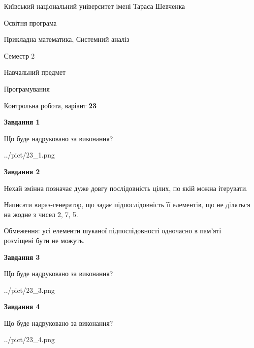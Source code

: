 \documentclass[12pt, ukrainian]{article}
\begin{document}
{{\begin {small}\par
{ \center  Київський національний університет імені Тараса Шевченка \par}
{\parbox {5 cm}{Освітня програма \hfill}{\parbox {8 cm}{Прикладна математика, Системний аналіз \hfill}}\parbox {5 cm}{\hfill Семестр 2}}\par
{\parbox {5 cm} {Навчальний предмет \hfill}\parbox {7 cm}{Програмування \hfill}\parbox {6cm}{\hfill}\par}\vspace{-7pt} \end{small}}{\center Контрольна робота, варіант  \No \textbf
{ 23 }\par}}
{
\begin {large}
{\begin {center}\textbf{Завдання 1}\end {center}}\par
Що буде надруковано за виконання?\par\par
\begin{center}
	{../pict/23_1.png}
\end{center}
\newpage

{\begin {center}\textbf{Завдання 2}\end {center}}\par
Нехай змінна  позначає дуже довгу послідовність цілих, по якій можна ітерувати.

Написати вираз-генератор, що задає підпослідовність її елементів, що не діляться на жодне з чисел 2, 7, 5.

Обмеження: усі елементи шуканої підпослідовності одночасно в пам'яті розміщені бути не можуть.\par
\newpage

{\begin {center}\textbf{Завдання 3}\end {center}}\par
Що буде надруковано за виконання?\par
\begin{center}
	{../pict/23_3.png}
\end{center}
\newpage

{\begin {center}\textbf{Завдання 4}\end {center}}\par
Що буде надруковано за виконання?\par
\begin{center}
	{../pict/23_4.png}
\end{center}
\newpage


\end{large}}
\end{document}
